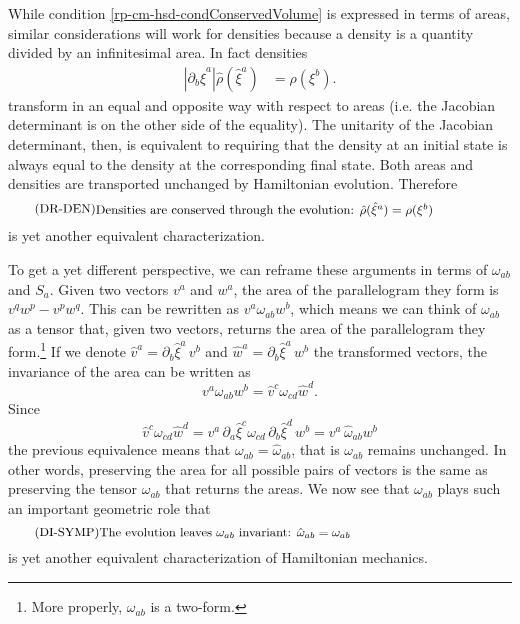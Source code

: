 While condition \ref{rp-cm-hsd-condConservedVolume} is expressed in terms of areas, similar considerations will work for densities because a density is a quantity divided by an infinitesimal area. In fact densities
\begin{equation}\label{rp-cm-densityTransformation1d}
	\begin{aligned}
		\left| \partial_b \hat{\xi}^a \right| \hat{\rho}(\hat{\xi}^a) &= \rho(\xi^b).
	\end{aligned}	
\end{equation}
transform in an equal and opposite way with respect to areas (i.e. the Jacobian determinant is on the other side of the equality). The unitarity of the Jacobian determinant, then, is equivalent to requiring that the density at an initial state is always equal to the density at the corresponding final state. Both areas and densities are transported unchanged by Hamiltonian evolution. Therefore
\begin{equation}\label{rp-cm-hsd-condConservedDensity}
	\tag{DR-DEN}
	\eqtext{Densities are conserved through the evolution: $\hat{\rho}(\hat{\xi}^a) = \rho(\xi^b)$ } 
\end{equation}
is yet another equivalent characterization.

To get a yet different perspective, we can reframe these arguments in terms of $\omega_{ab}$ and $S_a$. Given two vectors $v^a$ and $w^a$, the area of the parallelogram they form is $v^q w^p - v^p w^q$. This can be rewritten as $v^a \omega_{ab} w^b$, which means we can think of $\omega_{ab}$ as a tensor that, given two vectors, returns the area of the parallelogram they form.\footnote{More properly, $\omega_{ab}$ is a two-form.} If we denote $\hat{v}^a = \partial_b \hat{\xi}^a \, v^b$ and $\hat{w}^a = \partial_b \hat{\xi}^a \, w^b$ the transformed vectors, the invariance of the area can be written as
\begin{equation}
	v^a \omega_{ab} w^b = \hat{v}^c \omega_{cd} \hat{w}^d.
\end{equation}
Since
\begin{equation}
	\hat{v}^c \omega_{cd} \hat{w}^d = v^a \, \partial_a \hat{\xi}^c \omega_{cd} \, \partial_b \hat{\xi}^d \, w^b = v^a \, \hat{\omega}_{ab} w^b
\end{equation}
the previous equivalence means that $\omega_{ab} = \hat{\omega}_{ab}$, that is $\omega_{ab}$ remains unchanged. In other words, preserving the area for all possible pairs of vectors is the same as preserving the tensor $\omega_{ab}$ that returns the areas. We now see that $\omega_{ab}$ plays such an important geometric role that
\begin{equation}\label{rp-cm-hsd-condConservedSymplectic}
	\tag{DI-SYMP}
	\eqtext{The evolution leaves $\omega_{ab}$ invariant: $\hat{\omega}_{ab} = \omega_{ab}$} 
\end{equation}
is yet another equivalent characterization of Hamiltonian mechanics.


